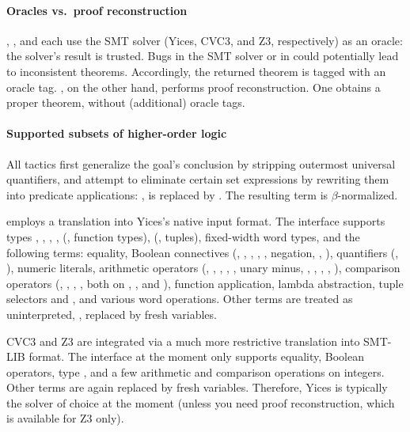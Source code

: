 \paragraph{Oracles vs.\ proof reconstruction}

, , and  each use the
SMT solver (Yices, CVC3, and Z3, respectively) as an oracle: the
solver's result is trusted.  Bugs in the SMT solver or in
 could potentially lead to inconsistent theorems.
Accordingly, the returned theorem is tagged with an oracle
tag. , on the other hand, performs proof reconstruction.
One obtains a proper \HOL{} theorem, without (additional) oracle tags.

\paragraph{Supported subsets of higher-order logic}

All tactics first generalize the goal's conclusion by stripping
outermost universal quantifiers, and attempt to eliminate certain set
expressions by rewriting them into predicate applications: \eg,
 is replaced by .  The resulting
term is $\beta$-normalized.

 employs a translation into Yices's native input
format.  The interface supports types , ,
, , \holtxt{->} (\ie, function types),
 (\ie, tuples), fixed-width word types, and the following
terms: equality, Boolean connectives (, ,
\holtxt{==>}, \holtxt{/\bs}, \holtxt{\bs /}, negation,
, ), quantifiers (\holtxt{!},
), numeric literals, arithmetic operators (,
\holtxt{+}, \holtxt{-}, \holtxt{*}, \holtxt{/}, unary minus,
, , , , ),
comparison operators (\holtxt{<}, \holtxt{<=}, \holtxt{>},
\holtxt{>=}, both on , , and ),
function application, lambda abstraction, tuple selectors 
and , and various word operations.  Other terms are
treated as uninterpreted, \ie, replaced by fresh variables.

CVC3 and Z3 are integrated via a much more restrictive translation
into SMT-LIB format.  The interface at the moment only supports
equality, Boolean operators, type , and a few arithmetic
and comparison operations on integers.  Other terms are again replaced
by fresh variables.  Therefore, Yices is typically the solver of
choice at the moment (unless you need proof reconstruction, which is
available for Z3 only).

